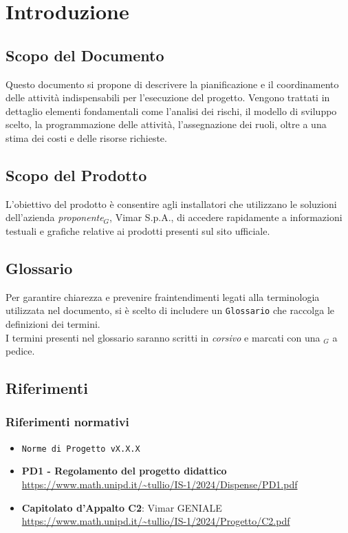\section{Introduzione}
\subsection{Scopo del Documento}
Questo documento si propone di descrivere la pianificazione e il coordinamento delle attività indispensabili per l'esecuzione del progetto. Vengono trattati in dettaglio elementi fondamentali come l'analisi dei rischi, il modello di sviluppo scelto, la programmazione delle attività, l'assegnazione dei ruoli, oltre a una stima dei costi e delle risorse richieste.
\subsection{Scopo del Prodotto} 
L'obiettivo del prodotto è consentire agli installatori che utilizzano le soluzioni dell'azienda \textit{proponente$_G$}, Vimar S.p.A., di accedere rapidamente a informazioni testuali e grafiche relative ai prodotti presenti sul sito ufficiale.
\subsection{Glossario}
Per garantire chiarezza e prevenire fraintendimenti legati alla terminologia utilizzata nel documento, si è scelto di includere un \texttt{Glossario} che raccolga le definizioni dei termini.\\ I termini presenti nel glossario saranno scritti in \textit{corsivo} e marcati con una $_G$ a pedice.
\subsection{Riferimenti}
\subsubsection{Riferimenti  normativi}  
\begin{itemize}
    \item \texttt{Norme di Progetto vX.X.X}\\
    \item \textbf{PD1 - Regolamento del progetto didattico} \\
    \url{https://www.math.unipd.it/~tullio/IS-1/2024/Dispense/PD1.pdf} 
    \item \textbf{Capitolato d'Appalto C2}: Vimar GENIALE \\
    \url{https://www.math.unipd.it/~tullio/IS-1/2024/Progetto/C2.pdf}
\end{itemize}
